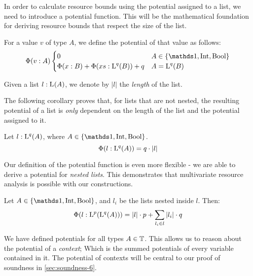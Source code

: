 In order to calculate resource bounds using the potential assigned to a list, we need to introduce a potential function. This will be the mathematical foundation for deriving resource bounds that respect the size of the list. 

\begin{definition}\label{def:potential-function}
   For a value \(v\) of type \(A\), we define the potential of that value as follows:
   \[
      \Phi(v : A) \begin{cases}
         0                                            & A \in \{\unit, \typeint, \bool\}\\
         \Phi(x : B) + \Phi(xs : \ralist{q}{B}) + q   & A = \ralist{q}{B}
      \end{cases}
   \]
\end{definition}

\begin{definition}\label{def:list-length}
   Given a list \(l : \text{L}^{}(A)\), we denote by \(|l|\) the \emph{length} of the list.
\end{definition}

The following corollary proves that, for lists that are not nested, the resulting potential of a list is \emph{only} dependent on the length of the list and the potential assigned to it.

\begin{corollary}\label{cor:potential-list}
   Let \(l : \text{L}^{q}(A)\), where \(A \in \{\unit, \typeint, \bool\}\). 
   \[
      \Phi(l : \text{L}^{q}(A)) = q \cdot |l|
   \]
\end{corollary}

Our definition of the potential function is even more flexible - we are able to derive a potential for \emph{nested lists}. This demonstrates that multivariate resource analysis is possible with our constructions.

\begin{corollary}\label{cor:potential-nested-list}
   Let \(A \in \{\unit, \typeint, \bool\}\), and \(l_i\) be the lists nested inside \(l\). Then:
   \[
      \Phi(l : \text{L}^{p}(\text{L}^{q}(A))) = |l| \cdot p + \sum_{l_i \in l} |l_i| \cdot q
   \]
\end{corollary}

We have defined potentials for all types \(A \in \mathbb{T}\). This allows us to reason about the potential of a \emph{context}; Which is the summed potentials of every variable contained in it. The potential of contexts will be central to our proof of soundness in \cref{sec:soundness-6}.

